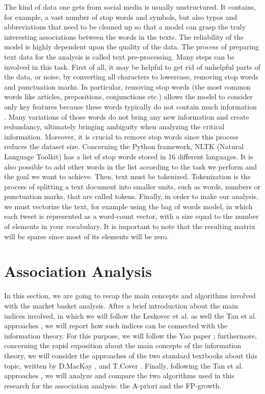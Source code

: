 \documentclass[12pt,%
               a4paper,%
               oneside,openany,%
               titlepage,%
               headinclude,footinclude,%
               BCOR5mm,%
               cleardoublepage=empty,%
               tablecaptionabove,%
               floatperchapter,
               ]{scrreprt}                 %
\begin{document}
The kind of data one gets from social media is usually unstructured. It contains, for example, a vast number of stop words and symbols, but also typos and abbreviations that need to be cleaned up so that a model can grasp the truly interesting associations between the words in the texts. The reliability of the model is highly dependent upon the quality of the data. The process of preparing text data for the analysis is called text pre-processing. Many steps can be involved in this task.
First of all, it may be helpful to get rid of unhelpful parts of the data, or noise, by converting all characters to lowercase, removing stop words and punctuation marks. In particular, removing stop words (the most common words like articles, prepositions, conjunctions etc.) allows the model to consider only key features because these words typically do not contain much information \cite{etaiwi2017impact}. Many variations of those words do not bring any new information and create redundancy, ultimately bringing ambiguity when analyzing the critical information. Moreover, it is crucial to remove stop words since this process reduces the dataset size. Concerning the Python framework, NLTK (Natural Language Toolkit) \cite{bird2009natural}  has a list of stop words stored in 16 different languages. It is also possible to add other words in the list according to the task we perform and the goal we want to achieve.
Then, text must be tokenized. Tokenization is the process of splitting a text document into smaller units, such as words, numbers or punctuation marks, that are called tokens.  Finally, in order to make our analysis, we must vectorize the text, for example using the bag of words model, in which each tweet is represented as a word-count vector, with a size equal to the number of elements in your vocabulary. It is important to note that the resulting matrix will be sparse since most of its elements will be zero.



\section{Association Analysis}
In this section, we are going to recap the main concepts and algorithms involved with the market basket analysis. After a brief introduction about the main indices involved, in which we will follow the Leskovec et al. \cite{leskovec2020mining} as well the Tan et al. approaches \cite{tan2019introduction}, we will report how such indices can be connected with the information theory. For this purpose, we will follow the Yao paper \cite{yao2003information}; furthermore, concerning the rapid exposition about the main concepts of the information theory, we will consider the approaches of the two standard textbooks about this topic, written by D.MacKay \cite{mackay2003information}, and T.Cover \cite{cover2006elements}. Finally, following the Tan et al. approaches \cite{tan2019introduction}, we will analyze and compare the two algorithms used in this research for the association analysis: the A-priori and the FP-growth.
\end{document}

